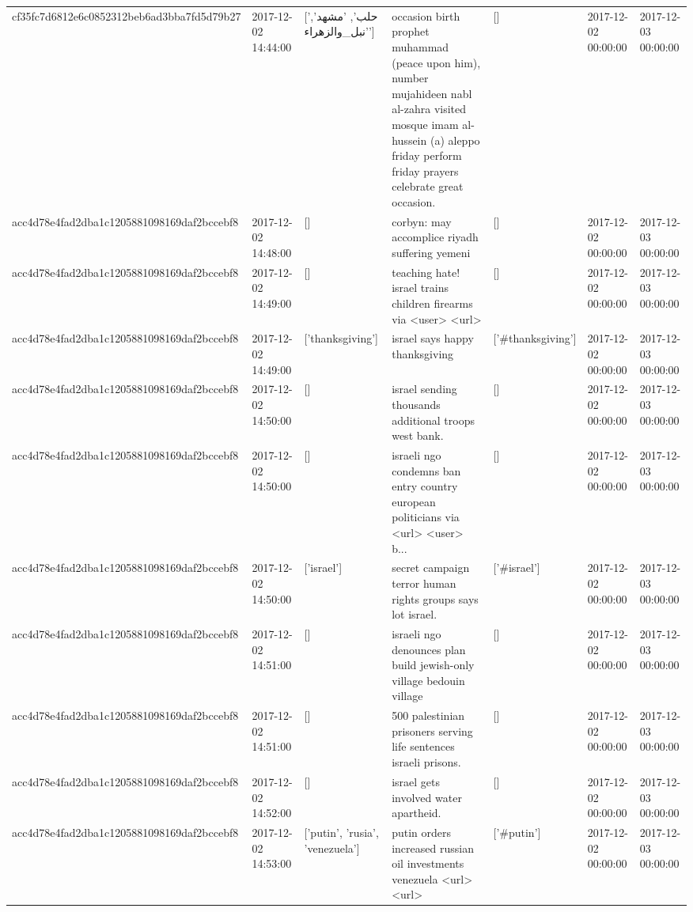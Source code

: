 \begin{tabular}{lllllll}
cf35fc7d6812e6c0852312beb6ad3bba7fd5d79b27 & 2017-12-02 14:44:00 & ['حلب', 'مشهد', 'نبل_والزهراء'] & occasion birth prophet muhammad (peace upon him), number mujahideen nabl al-zahra visited mosque imam al-hussein (a) aleppo friday perform friday prayers celebrate great occasion. & [] & 2017-12-02 00:00:00 & 2017-12-03 00:00:00 \\
acc4d78e4fad2dba1c1205881098169daf2bccebf8 & 2017-12-02 14:48:00 & [] & corbyn: may accomplice riyadh suffering yemeni & [] & 2017-12-02 00:00:00 & 2017-12-03 00:00:00 \\
acc4d78e4fad2dba1c1205881098169daf2bccebf8 & 2017-12-02 14:49:00 & [] & teaching hate! israel trains children firearms via <user> <url> & [] & 2017-12-02 00:00:00 & 2017-12-03 00:00:00 \\
acc4d78e4fad2dba1c1205881098169daf2bccebf8 & 2017-12-02 14:49:00 & ['thanksgiving'] & israel says happy thanksgiving & ['#thanksgiving'] & 2017-12-02 00:00:00 & 2017-12-03 00:00:00 \\
acc4d78e4fad2dba1c1205881098169daf2bccebf8 & 2017-12-02 14:50:00 & [] & israel sending thousands additional troops west bank. & [] & 2017-12-02 00:00:00 & 2017-12-03 00:00:00 \\
acc4d78e4fad2dba1c1205881098169daf2bccebf8 & 2017-12-02 14:50:00 & [] & israeli ngo condemns ban entry country european politicians via <url> <user> b... & [] & 2017-12-02 00:00:00 & 2017-12-03 00:00:00 \\
acc4d78e4fad2dba1c1205881098169daf2bccebf8 & 2017-12-02 14:50:00 & ['israel'] & secret campaign terror human rights groups says lot israel. & ['#israel'] & 2017-12-02 00:00:00 & 2017-12-03 00:00:00 \\
acc4d78e4fad2dba1c1205881098169daf2bccebf8 & 2017-12-02 14:51:00 & [] & israeli ngo denounces plan build jewish-only village bedouin village & [] & 2017-12-02 00:00:00 & 2017-12-03 00:00:00 \\
acc4d78e4fad2dba1c1205881098169daf2bccebf8 & 2017-12-02 14:51:00 & [] & 500 palestinian prisoners serving life sentences israeli prisons. & [] & 2017-12-02 00:00:00 & 2017-12-03 00:00:00 \\
acc4d78e4fad2dba1c1205881098169daf2bccebf8 & 2017-12-02 14:52:00 & [] & israel gets involved water apartheid. & [] & 2017-12-02 00:00:00 & 2017-12-03 00:00:00 \\
acc4d78e4fad2dba1c1205881098169daf2bccebf8 & 2017-12-02 14:53:00 & ['putin', 'rusia', 'venezuela'] & putin orders increased russian oil investments venezuela <url> <url> & ['#putin'] & 2017-12-02 00:00:00 & 2017-12-03 00:00:00 \\

\end{tabular}

